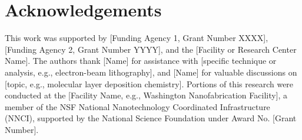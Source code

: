 \section*{Acknowledgements}

This work was supported by [Funding Agency 1, Grant Number XXXX], [Funding Agency 2, Grant Number YYYY], and the [Facility or Research Center Name].  
The authors thank [Name] for assistance with [specific technique or analysis, e.g., electron-beam lithography], and [Name] for valuable discussions on [topic, e.g., molecular layer deposition chemistry].  
Portions of this research were conducted at the [Facility Name, e.g., Washington Nanofabrication Facility], a member of the NSF National Nanotechnology Coordinated Infrastructure (NNCI), supported by the National Science Foundation under Award No. [Grant Number].

